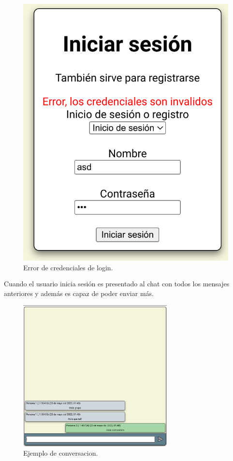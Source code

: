 \documentclass{article}
\begin{document}
\begin{figure}[H]
\begin{minipage}[H]{0.49\textwidth}
        \includegraphics[width=\textwidth]{images/errorlogin.png}
        \caption{Error de credenciales de login.}
    \end{minipage}
\end{figure}

Cuando el usuario inicia sesión es presentado al chat con todos los mensajes anteriores y además es capaz de poder enviar más.

\begin{figure}[H]
    \centering
    \includegraphics[width=0.7\textwidth]{images/chatmsg.png}
    \caption{Ejemplo de conversacion.}
\end{figure}
\end{document}
